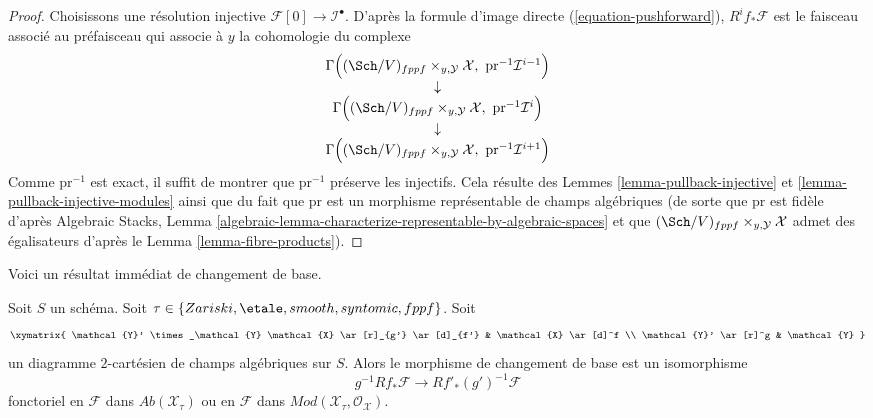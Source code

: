 \begin{proof}
Choisissons une résolution injective $\mathcal{F}[0] \to \mathcal{I}^\bullet$.
D'après la formule d'image directe (\ref{equation-pushforward}),
$R^if_*\mathcal{F}$ est le faisceau associé au préfaisceau qui associe
à $y$ la cohomologie du complexe
$$
\begin{matrix}
\Gamma\Big((\Sch/V)_{fppf} \times_{y, \mathcal{Y}} \mathcal{X},
\ \text{pr}^{-1}\mathcal{I}^{i - 1}\Big) \\
\downarrow \\
\Gamma\Big((\Sch/V)_{fppf} \times_{y, \mathcal{Y}} \mathcal{X},
\ \text{pr}^{-1}\mathcal{I}^i\Big) \\
\downarrow \\
\Gamma\Big((\Sch/V)_{fppf} \times_{y, \mathcal{Y}} \mathcal{X},
\ \text{pr}^{-1}\mathcal{I}^{i + 1}\Big)
\end{matrix}
$$
Comme $\text{pr}^{-1}$ est exact, il suffit de montrer que
$\text{pr}^{-1}$ préserve les injectifs. Cela résulte des
Lemmes \ref{lemma-pullback-injective} et
\ref{lemma-pullback-injective-modules}
ainsi que du fait que $\text{pr}$ est un morphisme représentable de
champs algébriques (de sorte que $\text{pr}$ est fidèle d'après
Algebraic Stacks, Lemma
\ref{algebraic-lemma-characterize-representable-by-algebraic-spaces}
et que
$(\Sch/V)_{fppf} \times_{y, \mathcal{Y}} \mathcal{X}$
admet des égalisateurs d'après le
Lemma \ref{lemma-fibre-products}).
\end{proof}

\noindent
Voici un résultat immédiat de changement de base.

\begin{lemma}
\label{lemma-base-change-higher-direct-images}
Soit $S$ un schéma. Soit
$\tau \in \{Zariski,\linebreak[0] \etale,\linebreak[0]
smooth,\linebreak[0] syntomic,\linebreak[0] fppf\}$. Soit
$$
\xymatrix{
\mathcal{Y}' \times_\mathcal{Y} \mathcal{X} \ar[r]_{g'} \ar[d]_{f'} &
\mathcal{X} \ar[d]^f \\
\mathcal{Y}' \ar[r]^g & \mathcal{Y}
}
$$
un diagramme $2$-cartésien de champs algébriques sur $S$. Alors le morphisme de
changement de base est un isomorphisme
$$
g^{-1}Rf_*\mathcal{F} \longrightarrow Rf'_*(g')^{-1}\mathcal{F}
$$
fonctoriel en $\mathcal{F}$ dans $\textit{Ab}(\mathcal{X}_\tau)$
ou en $\mathcal{F}$ dans $\textit{Mod}(\mathcal{X}_\tau, \mathcal{O}_\mathcal{X})$.
\end{lemma}

